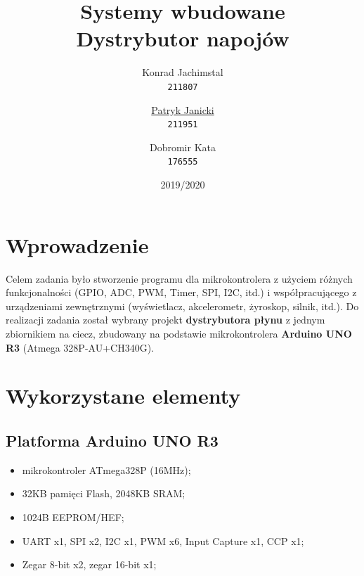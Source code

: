 \documentclass[11pt]{article}
\title{\textbf{Systemy wbudowane
\\{\Large Dystrybutor napojów}}}
\author{
  {Konrad Jachimstal}\\
  \texttt{211807}
  \and
  \underline{Patryk Janicki}\\
  \texttt{211951}
  \and
  {Dobromir Kata}\\
  \texttt{176555}
}
\date{2019/2020}
\begin{document}
\maketitle
\FloatBarrier
\newpage
\tableofcontents

\newpage

\section{Wprowadzenie}
Celem zadania było stworzenie programu dla mikrokontrolera z użyciem różnych funkcjonalności (GPIO, ADC, PWM, Timer, SPI, I2C, itd.) i współpracującego z urządzeniami zewnętrznymi (wyświetlacz, akcelerometr, żyroskop, silnik, itd.). Do realizacji zadania został wybrany projekt \textbf{dystrybutora płynu} z jednym zbiornikiem na ciecz, zbudowany na podstawie mikrokontrolera \textbf{Arduino UNO R3} (Atmega 328P-AU+CH340G).

\section{Wykorzystane elementy}
\subsection{Platforma Arduino UNO R3}
\begin{itemize}
    \item mikrokontroler ATmega328P (16MHz);
    \item 32KB pamięci Flash, 2048KB SRAM;
    \item 1024B EEPROM/HEF;
    \item UART x1, SPI x2, I2C x1, PWM x6, Input Capture x1, CCP x1;
    \item Zegar 8-bit x2, zegar 16-bit x1;
\end{itemize}
\end{document}

